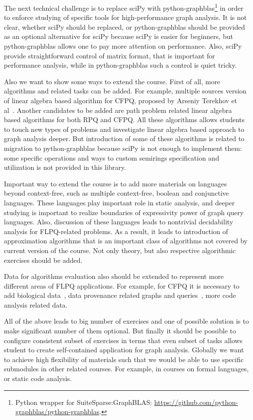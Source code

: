 \documentclass[sigconf]{acmart}
\begin{document}
The next technical challenge is to replace sciPy with python-graphblas\footnote{Python wrapper for SuiteSparse:GraphBLAS: \url{https://github.com/python-graphblas/python-graphblas}.} in order to enforce studying of specific tools for high-performance graph analysis. 
It is not clear, whether sciPy should be replaced, or python-graphblas should be provided as an optional alternative for sciPy because sciPy is easier for beginners, but python-graphblas allows one to pay more attention on performance.
Also, sciPy provide straightforward control of matrix format, that is important for performance analysis, while in python-graphblas such a control is quiet tricky.

Also we want to show some ways to extend the course. 
First of all, more algorithms and related tasks can be added.
For example, multiple sources version of linear algebra based algorithm for CFPQ, proposed by Arseniy Terekhov et al~\cite{terekhov2021multiple}.
Another candidates to be added are path problem related linear algebra based algorithms for both RPQ and CFPQ.
All these algorithms allows students to touch new types of problems and investigate linear algebra based approach to graph analysis deeper.
But introduction of some of these algorithms is related to migration to python-graphblas because sciPy is not enough to implement them: some specific operations and ways to custom semirings specification and utilization is not provided in this library.

Important way to extend the course is to add more materials on languages beyond context-free, such as multiple context-free, boolean and conjunctive languages. 
These languages play important role in static analysis, and deeper studying is important to realize boundaries of expressivity power of graph query languages.
Also, discussion of these languages leads to nontrivial decidability analysis for FLPQ-related problems.
As a result, it leads to introduction of approximation algorithms that is an important class of algorithms not covered by current version of the course.
Not only theory, but also respective algorithmic exercises should be added.

Data for algorithms evaluation also should be extended to represent more different areas of FLPQ applications.
For example, for CFPQ it is necessary to add biological data~\cite{SevonEronen+2008+157+172}, data provenance related graphs and queries~\cite{8731467}, more code analysis related data.

All of the above leads to big number of exercises and one of possible solution is to make significant number of them optional.
But finally it should be possible to configure consistent subset of exercises in terms that even subset of tasks allows student to create self-contained application for graph analysis.
Globally we want to achieve high flexibility of materials such that we would be able to use specific submodules in other related courses.
For example, in courses on formal languages, or static code analysis.




\end{document}
